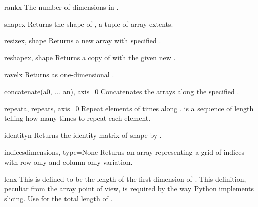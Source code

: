 \begin{funcdesc}{rank}{x} 
   The number of dimensions in .
\end{funcdesc}

\begin{funcdesc}{shape}{x}
   Returns the shape of , a tuple of array extents.
\end{funcdesc}

\begin{funcdesc}{resize}{x, shape}
   Returns a new array with specified .
\end{funcdesc}

\begin{funcdesc}{reshape}{x, shape}
   Returns a copy of  with the given new .
\end{funcdesc}

\begin{funcdesc}{ravel}{x}
   Returns  as one-dimensional .
\end{funcdesc}

\begin{funcdesc}{concatenate}{(a0, ... an), axis=0}
   Concatenates the arrays  along the specified .
\end{funcdesc}

\begin{funcdesc}{repeat}{a, repeats, axis=0}
   Repeat elements  of   times along .
    is a sequence of length  telling how many
   times to repeat each element.
\end{funcdesc}

\begin{funcdesc}{identity}{n}
   Returns the identity matrix of shape  by .
\end{funcdesc}

\begin{funcdesc}{indices}{dimensions, type=None}
   Returns an array representing a grid of indices with row-only and
   column-only variation.
\end{funcdesc}

\begin{funcdesc}{len}{x}
   This is defined to be the length of the first dimension of . This
   definition, peculiar from the array point of view, is required by the way
   Python implements slicing. Use  for the total length of
   .
\end{funcdesc}

